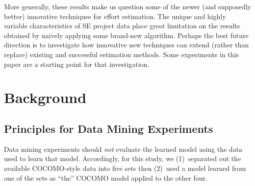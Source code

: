\documentclass{sig-alternate}
\begin{document}
More generally, these results make us question 
some of the newer (and supposedly better) innovative techniques for effort estimation.  
The unique and highly variable characteristics of SE
project data place great limitation on the results
obtained by naively applying some brand-new
algorithm.  Perhaps the best future direction is to
investigate how innovative new techniques can extend
(rather than replace) existing and successful
estimation methods.  Some experiments in this paper
are a starting point for that investigation.

\section{Background}


\subsection{Principles for Data Mining Experiments}\label{sect:overall}

Data mining experiments should
 {\em not}   evaluate the learned model using the data used to learn that model.
Accordingly, for this study, we (1)~separated out the available COCOMO-style data into five
sets then (2)~used a model learned from one of the sets as ``the'' COCOMO model applied to the other four.
\end{document}

